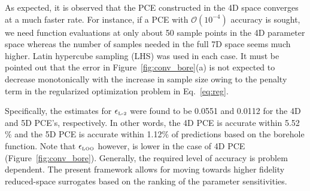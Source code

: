 %
As expected, it is observed that the PCE constructed in the 4D space converges
at a much faster rate. For instance, if a PCE with $\mathcal{O}(10^{-4})$
accuracy is sought, we need function evaluations at only about 50 sample points
in the 4D parameter space whereas the number of samples needed in the full 7D
space seems much higher. Latin hypercube sampling (LHS) was used in
each case. It must be pointed out that the error in Figure~\ref{fig:conv_bore}(a)
is not expected to decrease monotonically with the increase in sample size
owing to the penalty term in the regularized optimization problem in Eq.~\ref{eq:reg}. 

Specifically, the estimates for $\epsilon_{\mbox{\tiny{L-2}}}$ were
found to be 0.0551 and 0.0112 for the 4D and 5D PCE's, respectively. In other
words, the 4D PCE is accurate within 5.52$\%$ and the 5D PCE is accurate within
1.12$\%$ of predictions based on the borehole function. Note that $\epsilon_\text{\tiny{LOO}}$
however, is lower in the case of 4D PCE (Figure~\ref{fig:conv_bore}).
Generally, the required level of accuracy is problem dependent. 
The present framework allows for moving towards higher fidelity 
reduced-space surrogates based on the ranking of the parameter sensitivities. 
 

